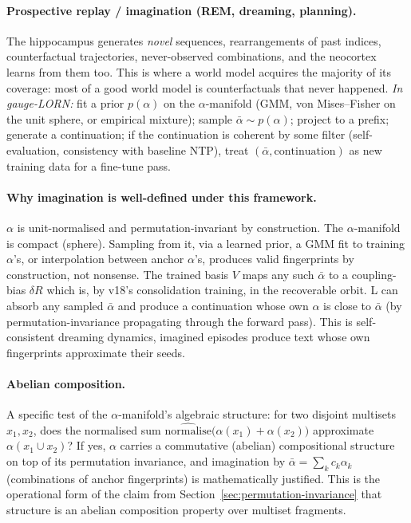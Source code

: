 \documentclass[11pt, a4paper]{article}
\theoremstyle{plain}
\theoremstyle{definition}
\theoremstyle{remark}
\begin{document}
\paragraph{Prospective replay / imagination (REM, dreaming, planning).}
The hippocampus generates \emph{novel} sequences, rearrangements of past indices, counterfactual trajectories, never-observed combinations, and the neocortex learns from them too.
This is where a world model acquires the majority of its coverage: most of a good world model is counterfactuals that never happened.
\emph{In gauge-LORN:} fit a prior $p(\alpha)$ on the $\alpha$-manifold (GMM, von Mises--Fisher on the unit sphere, or empirical mixture); sample $\bar \alpha \sim p(\alpha)$; project to a prefix; generate a continuation; if the continuation is coherent by some filter (self-evaluation, consistency with baseline NTP), treat $(\bar\alpha, \mathrm{continuation})$ as new training data for a fine-tune pass.

\paragraph{Why imagination is well-defined under this framework.}
$\alpha$ is unit-normalised and permutation-invariant by construction.
The $\alpha$-manifold is compact (sphere).
Sampling from it, via a learned prior, a GMM fit to training $\alpha$'s, or interpolation between anchor $\alpha$'s, produces valid fingerprints by construction, not nonsense.
The trained basis $V$ maps any such $\bar\alpha$ to a coupling-bias $\delta R$ which is, by v18's consolidation training, in the recoverable orbit.
L can absorb any sampled $\bar\alpha$ and produce a continuation whose own $\alpha$ is close to $\bar\alpha$ (by permutation-invariance propagating through the forward pass).
This is self-consistent dreaming dynamics, imagined episodes produce text whose own fingerprints approximate their seeds.

\paragraph{Abelian composition.}
A specific test of the $\alpha$-manifold's algebraic structure: for two disjoint multisets $x_1, x_2$, does the normalised sum $\hat{\mathrm{normalise}}\big(\alpha(x_1) + \alpha(x_2)\big)$ approximate $\alpha(x_1 \cup x_2)$?
If yes, $\alpha$ carries a commutative (abelian) compositional structure on top of its permutation invariance, and imagination by $\bar\alpha = \sum_k c_k \alpha_k$ (combinations of anchor fingerprints) is mathematically justified.
This is the operational form of the claim from Section~\ref{sec:permutation-invariance} that structure is an abelian composition property over multiset fragments.
\end{document}
